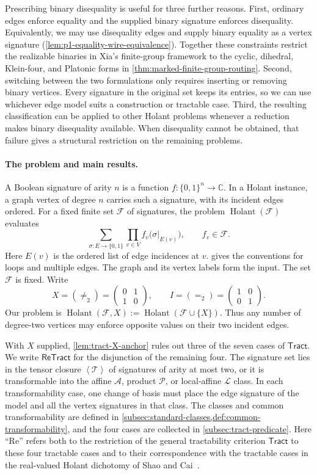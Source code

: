 \documentclass[11pt,letterpaper,onecolumn]{article}
\theoremstyle{plain}
\theoremstyle{definition}
\theoremstyle{remark}
\newcommand{\cF}{\mathcal F}
\newcommand{\cA}{\mathscr A}
\newcommand{\cP}{\mathscr P}
\newcommand{\cL}{\mathscr L}
\newcommand{\cT}{\mathscr T}
\newcommand{\angles}[1]{\left\langle #1\right\rangle}
\newcommand{\Holant}{\operatorname{Holant}}
\newcommand{\Tract}{\mathsf{Tract}}
\newcommand{\ReTract}{\mathsf{ReTract}}
\newcommand{\Eq}{=}
\newcommand{\Neq}{\neq}
\begin{document}
Prescribing binary disequality is useful for three further reasons.
First, ordinary edges enforce equality and the supplied binary signature
enforces disequality. Equivalently, we may use disequality edges and supply
binary equality as a vertex signature (\cref{lem:p1-equality-wire-equivalence}).
Together these constraints restrict the realizable binaries in Xia's finite-group
framework \cite[Section~4 and Table~2]{Xia2026FrameworkV1} to the cyclic,
dihedral, Klein-four, and Platonic forms in \cref{thm:marked-finite-group-routing}.
Second, switching between the two formulations only requires inserting or
removing binary vertices. Every signature in the original set keeps its
entries, so we can use whichever edge model suits a construction or
tractable case. Third, the resulting
classification can be applied to other Holant problems whenever a
reduction makes binary disequality available.
When disequality cannot be obtained, that failure gives a structural
restriction on the remaining problems.

\paragraph{The problem and main results.}
A Boolean signature of arity \(n\) is a function
\(f:\{0,1\}^n\to\mathbb C\).  In a Holant instance, a graph vertex
of degree \(n\) carries such a signature, with its incident edges ordered.
For a fixed finite set \(\cF\) of signatures, the problem
\(\Holant(\cF)\) evaluates
\[
  \sum_{\sigma:E\to\{0,1\}}
  \prod_{v\in V}f_v\bigl(\sigma|_{E(v)}\bigr),
  \qquad f_v\in\cF.
\]
Here \(E(v)\) is the ordered list of edge incidences at \(v\).
 gives the conventions for loops and
multiple edges.  The graph and its vertex labels form the input. The set
\(\cF\) is fixed.  Write
\[
 X=(\Neq_2)=\begin{pmatrix}0&1\\1&0\end{pmatrix},
 \qquad I=(\Eq_2)=\begin{pmatrix}1&0\\0&1\end{pmatrix}.
\]
Our problem is \(\Holant(\cF,X):=\Holant(\cF\cup\{X\})\).
Thus any number of degree-two vertices may enforce opposite values on
their two incident edges.

With \(X\) supplied, \cref{lem:tract-X-anchor} rules out three of the
seven cases of \(\Tract\). We write \(\ReTract\) for the disjunction of the
remaining four. The signature set lies in the tensor closure \(\angles{\cT}\)
of signatures of arity at most two, or it is transformable into the affine
\(\cA\), product \(\cP\), or local-affine \(\cL\) class. In each transformability case,
one change of basis must place the edge signature of the model and
all the vertex signatures in that class.
The classes and common transformability
are defined in \cref{subsec:standard-classes,def:common-transformability},
and the four cases are collected in \cref{subsec:tract-predicate}.
Here ``Re'' refers both
to the restriction of the general tractability criterion \(\Tract\)
to these four tractable cases and to their correspondence with the
tractable cases in the real-valued Holant dichotomy of Shao and
Cai~\cite{ShaoCai2020}.
\end{document}
